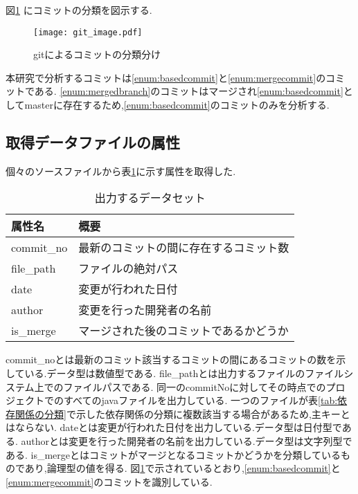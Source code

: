 \documentclass{fose2016}           %
\begin{document}
図\ref{fig:gitimage} にコミットの分類を図示する.

\begin{figure}[t]
\centering
\texttt{[image: git\_image.pdf]}
\caption{gitによるコミットの分類分け}
\label{fig:gitimage} 
\end{figure}

本研究で分析するコミットは\ref{enum:basedcommit}と\ref{enum:mergecommit}のコミットである.
\ref{enum:mergedbranch}のコミットはマージされ\ref{enum:basedcommit}としてmasterに存在するため,\ref{enum:basedcommit}のコミットのみを分析する.

\subsection{取得データファイルの属性}
個々のソースファイルから表\ref{tab:初期データセット}に示す属性を取得した.

\begin{table}[htb]
\caption{出力するデータセット}
\begin{tabular}{|l|l|} \hline
属性名 & 概要 \\ \hline
commit\_no & 最新のコミットの間に存在するコミット数 \\ \hline
file\_path & ファイルの絶対パス \\ \hline
date & 変更が行われた日付 \\ \hline
author & 変更を行った開発者の名前 \\ \hline
is\_merge & マージされた後のコミットであるかどうか \\ \hline
\end{tabular}
\label{tab:初期データセット}
\end{table}

commit\_noとは最新のコミット該当するコミットの間にあるコミットの数を示している.データ型は数値型である.
file\_pathとは出力するファイルのファイルシステム上でのファイルパスである.
同一のcommitNoに対してその時点でのプロジェクトでのすべてのjavaファイルを出力している.
一つのファイルが表\ref{tab:依存関係の分類}で示した依存関係の分類に複数該当する場合があるため,主キーとはならない.
dateとは変更が行われた日付を出力している.データ型は日付型である.
authorとは変更を行った開発者の名前を出力している.データ型は文字列型である.
is\_mergeとはコミットがマージとなるコミットかどうかを分類しているものであり,論理型の値を得る.
図\ref{fig:gitimage}で示されているとおり,\ref{enum:basedcommit}と\ref{enum:mergecommit}のコミットを識別している.
\end{document}
